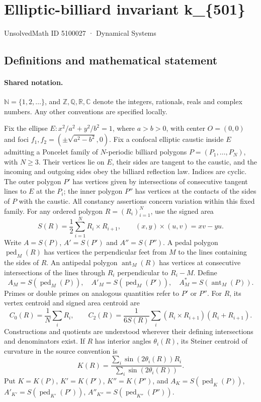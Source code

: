 \documentclass[11pt]{article}
\begin{document}
\setcounter{section}{5100026}
\section{Elliptic-billiard invariant k\_\{501\}}\label{5100027}
{\small\sffamily UnsolvedMath ID 5100027 · Dynamical Systems}
\subsection{Definitions and mathematical statement}

\paragraph{Shared notation.}$\mathbb N=\{1,2,\ldots\}$, and $\mathbb Z,\mathbb Q,\mathbb R,\mathbb C$ denote the integers, rationals, reals and complex numbers. Any other conventions are specified locally.


Fix the ellipse $E:x^2/a^2+y^2/b^2=1$, where $a>b>0$, with center $O=(0,0)$ and foci $f_1,f_2=(\pm\sqrt{a^2-b^2},0)$. Fix a confocal elliptic caustic inside $E$ admitting a Poncelet family of $N$-periodic billiard polygons $P=(P_1,\ldots,P_N)$, with $N\geq3$. Their vertices lie on $E$, their sides are tangent to the caustic, and the incoming and outgoing sides obey the billiard reflection law. Indices are cyclic. The outer polygon $P'$ has vertices given by intersections of consecutive tangent lines to $E$ at the $P_i$; the inner polygon $P''$ has vertices at the contacts of the sides of $P$ with the caustic. All constancy assertions concern variation within this fixed family.
For any ordered polygon $R=(R_i)_{i=1}^N$, use the signed area
\[S(R)=\frac12\sum_{i=1}^N R_i\times R_{i+1},\qquad (x,y)\times(u,v)=xv-yu.\]
Write $A=S(P)$, $A'=S(P')$ and $A''=S(P'')$. A pedal polygon $\operatorname{ped}_M(R)$ has vertices the perpendicular feet from $M$ to the lines containing the sides of $R$. An antipedal polygon $\operatorname{ant}_M(R)$ has vertices at consecutive intersections of the lines through $R_i$ perpendicular to $R_i-M$. Define
\[A_M=S(\operatorname{ped}_M(P)),\quad A'_M=S(\operatorname{ped}_M(P')),\quad A_M^*=S(\operatorname{ant}_M(P)).\]
Primes or double primes on analogous quantities refer to $P'$ or $P''$. For $R$, its vertex centroid and signed area centroid are
\[C_0(R)=\frac1N\sum_i R_i,\qquad C_2(R)=\frac{1}{6S(R)}\sum_i(R_i\times R_{i+1})(R_i+R_{i+1}).\]
Constructions and quotients are understood wherever their defining intersections and denominators exist.
If $R$ has interior angles $\theta_i(R)$, its Steiner centroid of curvature in the source convention is
\[K(R)=\frac{\sum_i\sin(2\theta_i(R))R_i}{\sum_i\sin(2\theta_i(R))}.\]
Put $K=K(P)$, $K'=K(P')$, $K''=K(P'')$, and $A_K=S(\operatorname{ped}_K(P))$, $A'_{K'}=S(\operatorname{ped}_{K'}(P'))$, $A''_{K''}=S(\operatorname{ped}_{K''}(P''))$.
\end{document}
